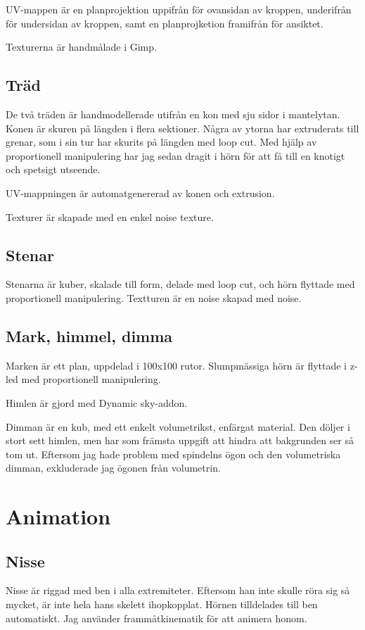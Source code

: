 \documentclass{article}
\begin{document}
UV-mappen är en planprojektion uppifrån för ovansidan av kroppen, underifrån för undersidan av kroppen, samt en planprojketion framifrån för ansiktet.

Texturerna är handmålade i Gimp.

\subsection{Träd}

De två träden är handmodellerade  utifrån en kon med sju sidor i mantelytan. Konen är skuren på längden i flera sektioner. Några av ytorna har extruderats till grenar, som i sin tur har skurits på längden med loop cut. Med hjälp av proportionell manipulering har jag sedan dragit i hörn för att få till en knotigt och spetsigt utseende.

UV-mappningen är automatgenererad av konen och extrusion.

Texturer är skapade med en enkel noise texture.

\subsection{Stenar}

Stenarna är kuber, skalade till form, delade med loop cut, och hörn flyttade med proportionell manipulering. Textturen är en noise  skapad med noise.

\subsection{Mark, himmel, dimma}
Marken är ett plan, uppdelad i 100x100 rutor. Slumpmässiga hörn är flyttade i z-led med proportionell manipulering.

Himlen är gjord med Dynamic sky-addon.

Dimman är en kub, med ett enkelt volumetrikst, enfärgat material. Den döljer i stort sett himlen, men har som främsta uppgift att hindra att bakgrunden ser så tom ut. Eftersom jag hade problem med spindelns ögon och den volumetriska dimman, exkluderade jag ögonen från volumetrin. 
\section{Animation}
\subsection{Nisse}

Nisse är riggad med ben i alla extremiteter. Eftersom han inte skulle röra sig så mycket, är inte hela hans skelett ihopkopplat. Hörnen tilldelades till ben automatiskt. Jag använder frammåtkinematik för att animera honom. 
\end{document}
